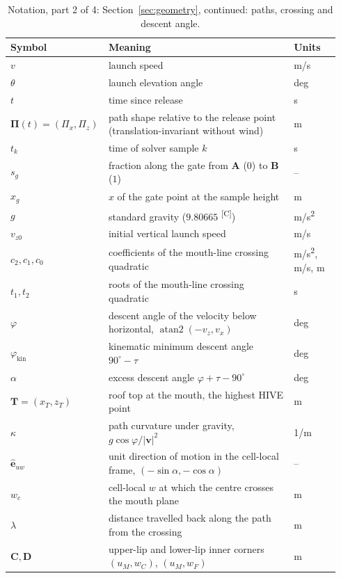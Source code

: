 \documentclass[11pt]{article}
\makeatletter
\DeclareRobustCommand{\provtag}[1]{%
  \ifmmode\text{\provtag@text{#1}}\else\provtag@text{#1}\fi}
\newcommand{\provtag@text}[1]{%
  \textsuperscript{\textsf{\upshape\scriptsize\color@grey[#1]}}}
\newcommand{\color@grey}[1]{#1}
\newcommand{\color@grey}[1]{\pdfliteral{0.45 g}#1\pdfliteral{0 g}}
\DeclareRobustCommand{\confirmed}{\provtag{C}}
\newcommand{\vect}[1]{\bm{#1}}
\makeatother
\begin{document}
\begin{table}[p]
\centering
\small
\caption{Notation, part 2 of 4: Section~\ref{sec:geometry}, continued: paths, crossing and descent angle.}
\label{tab:notation-2}
\begin{tabular}{@{}p{0.24\linewidth}p{0.56\linewidth}p{0.14\linewidth}@{}}
  \toprule
  Symbol & Meaning & Units \\
  \midrule
  $v$ & launch speed & m/s \\
  $\theta$ & launch elevation angle & deg \\
  $t$ & time since release & s \\
  $\vect{\Pi}(t)=(\Pi_x,\Pi_z)$ & path shape relative to the release point (translation-invariant without wind) & m \\
  $t_k$ & time of solver sample $k$ & s \\
  $s_g$ & fraction along the gate from $\vect{A}$ ($0$) to $\vect{B}$ ($1$) & -- \\
  $x_g$ & $x$ of the gate point at the sample height & m \\
  $g$ & standard gravity ($9.80665$\confirmed) & m/s\textsuperscript{2} \\
  $v_{z0}$ & initial vertical launch speed & m/s \\
  $c_2,c_1,c_0$ & coefficients of the mouth-line crossing quadratic & m/s\textsuperscript{2}, m/s, m \\
  $t_1,t_2$ & roots of the mouth-line crossing quadratic & s \\
  $\varphi$ & descent angle of the velocity below horizontal, $\operatorname{atan2}(-v_z,v_x)$ & deg \\
  $\varphi_{\mathrm{kin}}$ & kinematic minimum descent angle $90^\circ-\tau$ & deg \\
  $\alpha$ & excess descent angle $\varphi+\tau-90^\circ$ & deg \\
  $\vect{T}=(x_T,z_T)$ & roof top at the mouth, the highest HIVE point & m \\
  $\kappa$ & path curvature under gravity, $g\cos\varphi/|\vect{v}|^2$ & 1/m \\
  $\hat{\vect{e}}_{uw}$ & unit direction of motion in the cell-local frame, $(-\sin\alpha,-\cos\alpha)$ & -- \\
  $w_c$ & cell-local $w$ at which the centre crosses the mouth plane & m \\
  $\lambda$ & distance travelled back along the path from the crossing & m \\
  $\vect{C},\vect{D}$ & upper-lip and lower-lip inner corners $(u_M,w_C)$, $(u_M,w_F)$ & m \\

\end{tabular}
\end{table}
\end{document}
